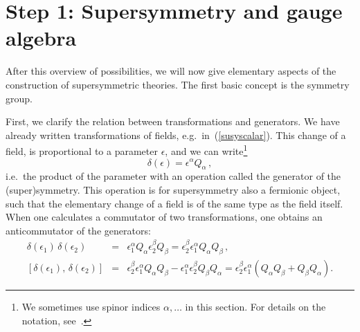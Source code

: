 \documentclass[a4paper,11pt,twoside]{article}
\newcommand{\OliveGreen}[1]{#1}
\newcommand{\Blue}[1]{#1}
\begin{document}
\section{Step 1: Supersymmetry and gauge algebra} \label{ss:salgebra}
After this overview of possibilities, we will now give elementary aspects
of the construction of supersymmetric theories. The first basic concept
is the symmetry group.

First, we clarify the relation between transformations and generators. We
have already written transformations of fields, e.g.\
in~(\ref{susyscalar}). This change of a field, is proportional to a
parameter $\epsilon $, and we can write\footnote{We sometimes use spinor
indices $\alpha ,\ldots $ in this section. For details on the notation,
see~\cite{VanProeyen:1999ni}.}
\begin{equation}
  \delta (\OliveGreen{\epsilon })=\OliveGreen{\epsilon ^\alpha}
\Blue{Q_\alpha}\,,
 \label{deltaEpsQ}
\end{equation}
i.e.\ the product of the parameter with an operation called the generator
of the (super)symmetry. This operation is for supersymmetry also a
fermionic object, such that the elementary change of a field is of the
same type as the field itself. When one calculates a commutator of two
transformations, one obtains an anticommutator of the generators:
\begin{eqnarray}
\delta(\OliveGreen{\epsilon _1})\,\delta (\OliveGreen{\epsilon _2})&=&
 \OliveGreen{\epsilon_1 ^\alpha} \Blue{Q_\alpha}\OliveGreen{\epsilon_2 ^\beta}
 \Blue{Q_\beta}=\OliveGreen{\epsilon_2 ^\beta}\OliveGreen{\epsilon_1 ^\alpha} \Blue{Q_\alpha}
 \Blue{Q_\beta}\,, \nonumber\\
\left[ \delta(\OliveGreen{\epsilon _1}),\,\delta (\OliveGreen{\epsilon
_2})\right]&=& \OliveGreen{\epsilon_2 ^\beta}\OliveGreen{\epsilon_1
^\alpha} \Blue{Q_\alpha} \Blue{Q_\beta}-\OliveGreen{\epsilon_1 ^\alpha
}\OliveGreen{\epsilon_2 ^\beta } \Blue{Q_\beta } \Blue{Q_\alpha }
= \OliveGreen{\epsilon_2 ^\beta}\OliveGreen{\epsilon_1
^\alpha}\left(\Blue{Q_\alpha} \Blue{Q_\beta}+\Blue{Q_\beta }
\Blue{Q_\alpha }\right).
\end{eqnarray}
\end{document}
